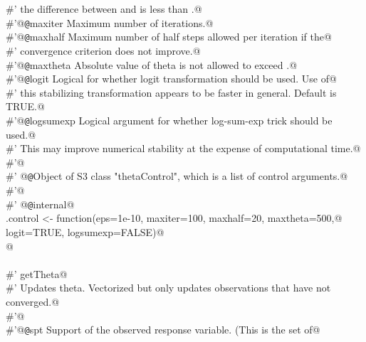 \documentclass[reqno]{amsart}
\begin{document}
\begin{flushleft}
\begin{list}{}{}
\mbox{}\verb@#' the difference between  and \eqn{\mu} is less than .@\\
\mbox{}\verb@#'@{\tt @}\verb@param maxiter Maximum number of iterations.@\\
\mbox{}\verb@#'@{\tt @}\verb@param maxhalf Maximum number of half steps allowed per iteration if the@\\
\mbox{}\verb@#' convergence criterion does not improve.@\\
\mbox{}\verb@#'@{\tt @}\verb@param maxtheta Absolute value of theta is not allowed to exceed .@\\
\mbox{}\verb@#'@{\tt @}\verb@param logit Logical for whether logit transformation should be used. Use of@\\
\mbox{}\verb@#' this stabilizing transformation appears to be faster in general. Default is TRUE.@\\
\mbox{}\verb@#'@{\tt @}\verb@param logsumexp Logical argument for whether log-sum-exp trick should be used.@\\
\mbox{}\verb@#' This may improve numerical stability at the expense of computational time.@\\
\mbox{}\verb@#'@\\
\mbox{}\verb@#' @{\tt @}\verb@return Object of S3 class "thetaControl", which is a list of control arguments.@\\
\mbox{}\verb@#'@\\
\mbox{}\verb@#' @{\tt @}\verb@keywords internal@\\
\mbox{}\verb@theta.control <- function(eps=1e-10, maxiter=100, maxhalf=20, maxtheta=500,@\\
\mbox{}\verb@                          logit=TRUE, logsumexp=FALSE)@\\
\mbox{}@\\
\mbox{}\verb@@\\
\mbox{}\verb@#' getTheta@\\
\mbox{}\verb@#' Updates theta. Vectorized but only updates observations that have not converged.@\\
\mbox{}\verb@#'@\\
\mbox{}\verb@#'@{\tt @}\verb@param spt Support of the observed response variable. (This is the set of@\\

\end{list}
\end{flushleft}
\end{document}
